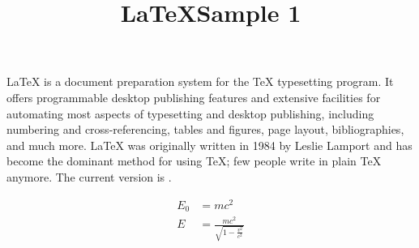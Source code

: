 \documentclass{article}
\title{\LaTeX Sample 1}
\begin{document}
\maketitle
\LaTeX{} is a document preparation system for
the \TeX{} typesetting program. It offers
programmable desktop publishing features and
extensive facilities for automating most
aspects of typesetting and desktop publishing,
including numbering and  cross-referencing,
tables and figures, page layout,
bibliographies, and much more. \LaTeX{} was
originally written in 1984 by Leslie Lamport
and has become the  dominant method for using
\TeX; few people write in plain \TeX{} anymore.
The current version is \LaTeXe.

\begin{align}
E_0 &= mc^2 \\
E &= \frac{mc^2}{\sqrt{1-\frac{v^2}{c^2}}}
\end{align}  
\end{document}
